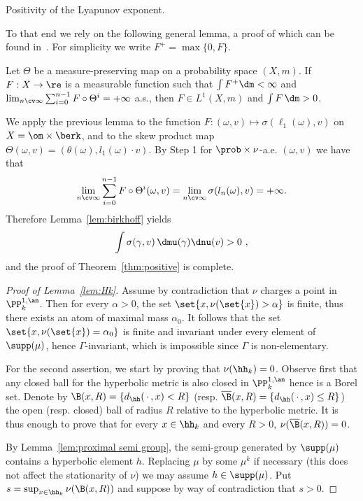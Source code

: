 \begin{step}[Step 4]
Positivity of the Lyapunov exponent.

To that end we rely on the following general lemma, a proof of which can be found in~\cite[Lem.~2.3, p.~22]{bougerol-lacroix}. For simplicity we write $F^+ = \max \{ 0, F\}$.

\begin{lemm}\label{lem:birkhoff}
Let $\Theta$ be a measure-preserving map on a probability space $(X, m)$. If $F:X\to \re$ is a measurable function such that $\int F^+ \dm <\infty$ and $\lim_{n\cv\infty} \sum_{i=0}^{n-1} F\circ \Theta^i = +\infty $ a.s., then $F\in L^1(X,m)$ and $\int F \,\dm >0$.
\end{lemm}

We apply the previous lemma to the function $F: (\omega, v) \mapsto \sigma(\ell_1(\omega), v)$ on $X=\om\times \berk$, and to the skew product map $\Theta(\omega,v) = (\theta(\omega), l_1(\omega) \cdot v)$. By Step 1 for $\prob\times \nu$-a.e. $(\omega,v)$ we have that
\[
\lim_{n\cv\infty} \sum_{i=0}^{n-1} F\circ \Theta^i (\omega,v) = \lim_{n\cv\infty} \sigma(l_n(\omega),v) = +\infty.
\]
Therefore Lemma~\ref{lem:birkhoff} yields
\begin{equation}\label{eqL}
\int \sigma(\gamma, v)\, \dmu(\gamma)\dnu(v) >0~,
\end{equation}
and the proof of Theorem~\ref{thm:positive} is complete.

\begin{proof}[Proof of Lemma~\ref{lem:Hk}]
Assume by contradiction that $\nu$ charges a point in $\PP^{1,\an}_k$. Then for every $\alpha>0$, the set $\set{x, \nu(\set{x})>\alpha}$ is finite, thus there exists an atom of maximal mass $\alpha_0$. It follows that the set $\set {x, \nu(\set{x})=\alpha_0}$ is finite and invariant under every element of $\supp(\mu)$, hence $\Gamma$-invariant, which is impossible since $\Gamma$ is non-elementary.

For the second assertion, we start by proving that $\nu(\hh_k) =0$. Observe first that any closed ball for the hyperbolic metric is also closed in $\PP^{1,\an}_k$ hence is a Borel set. Denote by $\B(x,R) = \{ d_{\hh}({\,\cdot\,}, x) < R\}$ (resp. $\overline{\B}(x,R) = \{ d_{\hh}({\,\cdot\,}, x) \le R\}$) the open (resp. closed) ball of radius $R$ relative to the hyperbolic metric. It is thus enough to prove that for every $x\in \hh_k$ and every $R>0$, $\nu(\overline{\B}(x,R)) = 0$.

By Lemma~\ref{lem:proximal semi group}, the semi-group generated by $\supp(\mu)$ contains a hyperbolic element $h$. Replacing $\mu$ by some $\mu^k$ if necessary (this does not affect the stationarity of $\nu$) we may assume $h\in \supp(\mu)$. Put $s= \sup_{x\in \hh_k} \nu(\B(x,R))$ and suppose by way of contradiction that $s>0$.


\end{proof}
\end{step}
